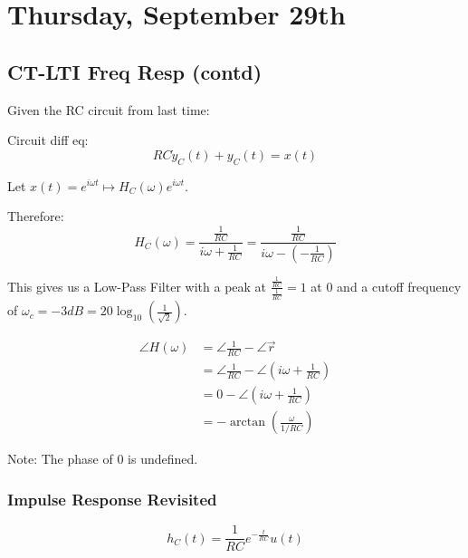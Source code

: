 \section{Thursday, September 29th}
\subsection{CT-LTI Freq Resp (contd)}
Given the RC circuit from last time:


Circuit diff eq:
\[
    RC\Dot{y}_C(t) + y_C(t) = x(t)
\]

Let $x(t) = e^{i\omega t}\mapsto H_C(\omega) e^{i\omega t}$.

Therefore:
\[
    H_C(\omega) = \frac{\frac1{RC}}{i\omega + \frac1{RC}}
     = \frac{\frac1{RC}}{i\omega - \left(-\frac1{RC}\right)}
\]

This gives us a Low-Pass Filter with a peak at $\frac{\frac1{RC}}{\frac1{RC}}=1$ at 0 and a cutoff frequency of $\omega_c = -3dB=20\log_{10}\left(\frac1{\sqrt{2}}\right)$.

\begin{align*}
    \angle H(\omega)
    &= \angle \frac1{RC} - \angle \vec r
    \\
    &= \angle \frac1{RC} - \angle (i\omega + \frac1{RC})
    \\ 
    &= 0 - \angle (i\omega + \frac1{RC})
    \\
    &= -\arctan(\frac{\omega}{1/RC})
\end{align*}

Note: The phase of 0 is undefined.

\subsubsection{Impulse Response Revisited}
\[
    h_C(t) = \frac1{RC} e^{-\frac t{RC}} u(t)
\]


